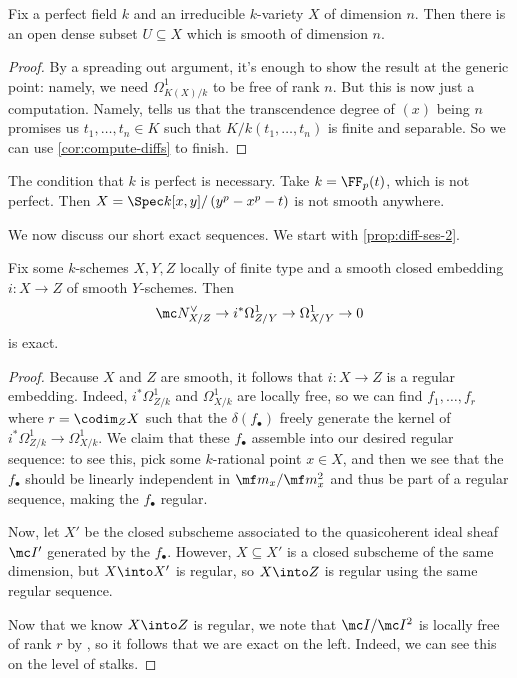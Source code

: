 \documentclass[../notes.tex]{subfiles}
\begin{document}
\begin{corollary}
	Fix a perfect field $k$ and an irreducible $k$-variety $X$ of dimension $n$. Then there is an open dense subset $U\subseteq X$ which is smooth of dimension $n$.
\end{corollary}
\begin{proof}
	By a spreading out argument, it's enough to show the result at the generic point: namely, we need $\Omega^1_{K(X)/k}$ to be free of rank $n$. But this is now just a computation. Namely, \cite[Theorem~A.1.3]{eisenbud-comm-alg} tells us that the transcendence degree of $(x)$ being $n$ promises us $t_1,\ldots,t_n\in K$ such that $K/k(t_1,\ldots,t_n)$ is finite and separable. So we can use \autoref{cor:compute-diffs} to finish.
\end{proof}
\begin{nex}
	The condition that $k$ is perfect is necessary. Take $k=\FF_p(t)$, which is not perfect. Then $X=\Spec k[x,y]/\left(y^p-x^p-t\right)$ is not smooth anywhere.
\end{nex}
We now discuss our short exact sequences. We start with \autoref{prop:diff-ses-2}.
\begin{proposition}
	Fix some $k$-schemes $X,Y,Z$ locally of finite type and a smooth closed embedding $i\colon X\to Z$ of smooth $Y$-schemes. Then
	\[\mc N_{X/Z}^\lor\to i^*\Omega^1_{Z/Y}\to\Omega^1_{X/Y}\to0\]
	is exact.
\end{proposition}
\begin{proof}
	Because $X$ and $Z$ are smooth, it follows that $i\colon X\to Z$ is a regular embedding. Indeed, $i^*\Omega^1_{Z/k}$ and $\Omega^1_{X/k}$ are locally free, so we can find $f_1,\ldots,f_r$ where $r=\codim_ZX$ such that the $\delta(f_\bullet)$ freely generate the kernel of $i^*\Omega^1_{Z/k}\to\Omega^1_{X/k}$. We claim that these $f_\bullet$ assemble into our desired regular sequence: to see this, pick some $k$-rational point $x\in X$, and then we see that the $f_\bullet$ should be linearly independent in $\mf m_x/\mf m_x^2$ and thus be part of a regular sequence, making the $f_\bullet$ regular.

	Now, let $X'$ be the closed subscheme associated to the quasicoherent ideal sheaf $\mc I'$ generated by the $f_\bullet$. However, $X\subseteq X'$ is a closed subscheme of the same dimension, but $X\into X'$ is regular, so $X\into Z$ is regular using the same regular sequence.

	Now that we know $X\into Z$ is regular, we note that $\mc I/\mc I^2$ is locally free of rank $r$ by \cite[22.2.16]{rising-sea}, so it follows that we are exact on the left. Indeed, we can see this on the level of stalks.
\end{proof}
\end{document}
